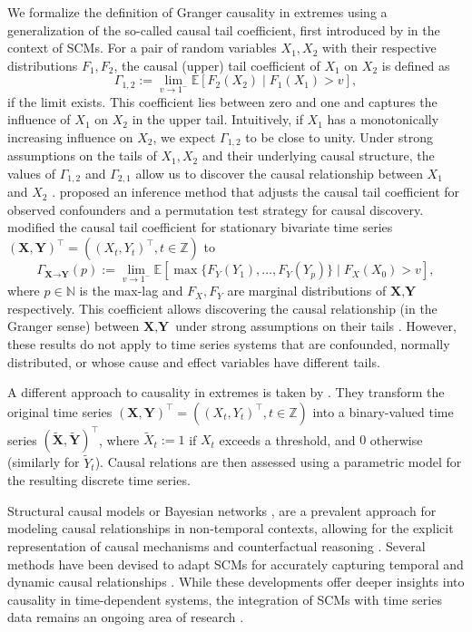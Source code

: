 \documentclass[a4paper,11pt]{article}
\begin{document}
We formalize the definition of Granger causality in extremes using a generalization of the so-called causal tail coefficient, first introduced by \cite{Gnecco} in the context of SCMs. For a pair of random variables $X_1, X_2$  with their respective distributions $F_1, F_2$, the causal (upper) tail coefficient of $X_1$ on $X_2$ is defined as
$$
\Gamma_{1,2} := \lim_{v\to 1^-}\mathbb{E}[ F_2(X_2)\mid F_1(X_1)>v ], 
$$
if the limit exists. This coefficient lies between zero and one and captures the influence of $X_1$ on $X_2$ in the upper tail. Intuitively, if $X_1$ has a monotonically increasing influence on $X_2$, we expect $\Gamma_{1,2}$ to be close to unity. Under strong assumptions on the tails of $X_1, X_2$ and their underlying causal structure, the values of $\Gamma_{1,2}$ and $\Gamma_{2,1}$ allow us to discover the causal relationship between $X_1$ and $X_2$ \citep[Theorem~1]{Gnecco}. \cite{Pasche} proposed an inference method that adjusts the causal tail coefficient for observed confounders and a permutation test strategy for causal discovery. \cite{bodik} modified the causal tail coefficient for stationary bivariate time series $(\textbf{X},\textbf{Y})^\top= ((X_t,Y_t)^\top, t\in\mathbb{Z})$ to
$$
\Gamma_{\textbf{X}\to \textbf{Y}}(p):=\lim_{v\to 1^-}\mathbb{E}[\max\{F_Y(Y_1), \dots, F_Y(Y_{p})\}\mid F_X(X_0)>v],
$$
where $p\in\mathbb{N}$ is the max-lag and $F_X, F_Y$ are marginal distributions of $\textbf{X},\textbf{Y}$ respectively. This coefficient allows discovering the causal relationship (in the Granger sense) between $\textbf{X},\textbf{Y}$ under strong assumptions on their tails \citep[Theorem~1]{bodik}. However, these results do not apply to time series systems that are confounded, normally distributed, or whose cause and effect variables have different tails. 

A different approach to causality in extremes is taken by \cite{hong2009granger, Candelon2013, Mazzarisi_causality_in_tail}. They transform the original time series $(\textbf{X},\textbf{Y})^\top = ((X_t,Y_t)^\top, t\in\mathbb{Z})$ into a binary-valued time series $(\tilde{\textbf{X}},\tilde{\textbf{Y}})^\top$, where $\tilde{X}_t := 1$ if $X_t$ exceeds a threshold, and $0$ otherwise (similarly for $\tilde{Y}_t$). Causal relations are then assessed using a parametric model for the resulting discrete time series.

Structural causal models \citep[SCMs,][]{Pearl_book, Elements_of_Causal_Inference} or Bayesian networks \citep{PCalgorithm}, are a prevalent approach for modeling causal relationships in non-temporal contexts, allowing for the explicit representation of causal mechanisms and counterfactual reasoning \citep{bodik2026retrospective}. Several methods have been devised to adapt SCMs for accurately capturing temporal and dynamic causal relationships \citep{white2010granger, Eicher}. While these developments offer deeper insights into causality in time-dependent systems, the integration of SCMs with time series data remains an ongoing area of research
\citep{TIMINOPeters, Runge2019PCMCI, Pamfil2020DYNOTEARSSL, assaad2022survey}.
\end{document}
